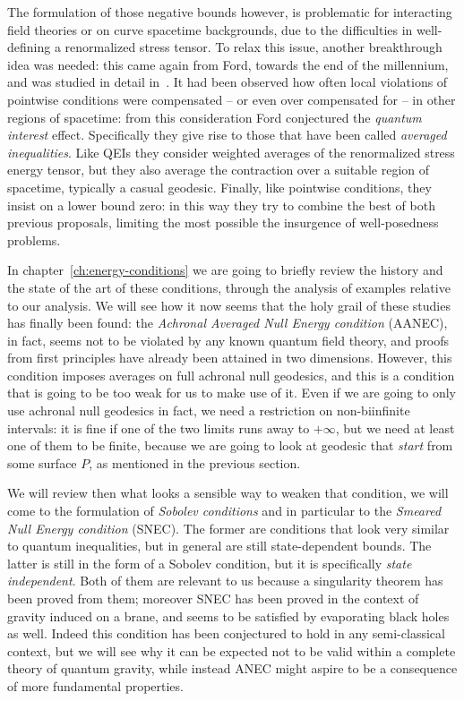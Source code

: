 The formulation of those negative bounds however, is problematic for interacting field theories or on curve spacetime backgrounds, due to the difficulties in well-defining a renormalized stress tensor. To relax this issue, another breakthrough idea was needed: this came again from Ford, towards the end of the millennium, and was studied in detail in~\cite[]{ford1999quantum}. It had been observed how often local violations of pointwise conditions were compensated -- or even over compensated for -- in other regions of spacetime: from this consideration Ford conjectured the \emph{quantum interest} effect. Specifically they give rise to those that have been called \emph{averaged inequalities}. Like QEIs they consider weighted averages of the renormalized stress energy tensor, but they also average the contraction over a suitable region of spacetime, typically a casual geodesic. Finally, like pointwise conditions, they insist on a lower bound zero: in this way they try to combine the best of both previous proposals, limiting the most possible the insurgence of well-posedness problems.

In chapter~\ref{ch:energy-conditions} we are going to briefly review the history and the state of the art of these conditions, through the analysis of examples relative to our analysis. We will see how it now seems that the holy grail of these studies has finally been found: the \emph{Achronal Averaged Null Energy condition} (AANEC), in fact, seems not to be violated by any known quantum field theory, and proofs from first principles have already been attained in two dimensions. However, this condition imposes averages on full achronal null geodesics, and this is a condition that is going to be too weak for us to make use of it.
Even if we are going to only use achronal null geodesics in fact, we need a restriction on non-biinfinite intervals: it is fine if one of the two limits runs away to \(+\infty\), but we need at least one of them to be finite, because we are going to look at geodesic that \emph{start} from some surface \(P\), as mentioned in the previous section.

We will review then what looks a sensible way to weaken that condition, we will come to the formulation of \emph{Sobolev conditions} and in particular to the \emph{Smeared Null Energy condition} (SNEC). The former are conditions that look very similar to quantum inequalities, but in general are still state-dependent bounds. The latter is still in the form of a Sobolev condition, but it is specifically \emph{state independent}. Both of them are relevant to us because a singularity theorem has been proved from them; moreover SNEC has been proved in the context of gravity induced on a brane, and seems to be satisfied by evaporating black holes as well. Indeed this condition has been conjectured to hold in any semi-classical context, but we will see why it can be expected not to be valid within a complete theory of quantum gravity, while instead ANEC might aspire to be a consequence of more fundamental properties.

